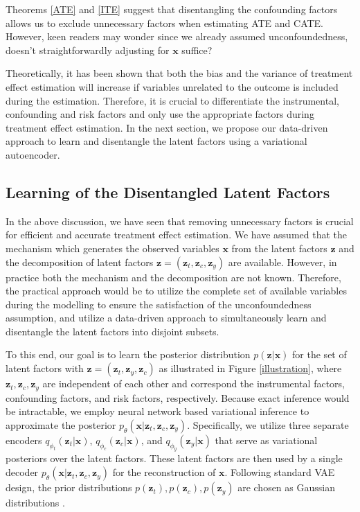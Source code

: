 \documentclass[letterpaper]{article} %
\begin{document}
Theorems \ref{ATE} and \ref{ITE} suggest that disentangling the confounding factors allows us to exclude unnecessary factors when estimating ATE and CATE. However, keen readers may wonder since we already assumed unconfoundedness, doesn't straightforwardly adjusting for $\mathbf{x}$ suffice?

Theoretically, it has been shown that both the bias \cite{Abadie2006} and the variance \cite{Hahn1998} of treatment effect estimation will increase if variables unrelated to the outcome is included during the estimation. Therefore, it is crucial to differentiate the instrumental, confounding and risk factors and only use the appropriate factors during treatment effect estimation.
In the next section, we propose our data-driven approach to learn and disentangle the latent factors using a variational autoencoder.


\subsection*{Learning of the Disentangled Latent Factors}


In the above discussion, we have seen that removing unnecessary factors is crucial for efficient and accurate treatment effect estimation. We have assumed that the mechanism which generates the observed variables $\mathbf{x}$ from the latent factors $\mathbf{z}$ and the decomposition of latent factors $\mathbf{z} = (\mathbf{z}_t, \mathbf{z}_c, \mathbf{z}_y)$ are available.
However, in practice both the mechanism and the decomposition are not known. Therefore, the practical approach would be to utilize the complete set of available variables during the modelling to ensure the satisfaction of the unconfoundedness assumption, and utilize a data-driven approach to simultaneously learn and disentangle the latent factors into disjoint subsets.

To this end, our goal is to learn the posterior distribution $p(\mathbf{z}|\mathbf{x})$ for the set of latent factors  with $\mathbf{z}= (\mathbf{z}_t, \mathbf{z}_y, \mathbf{z}_c)$ as illustrated in Figure \ref{illustration}, where $\mathbf{z}_t,\mathbf{z}_c, \mathbf{z}_y$ are independent of each other and correspond the instrumental factors, confounding factors, and risk factors, respectively.
Because exact inference would be intractable, we employ neural network based variational inference to approximate the posterior $p_\theta(\mathbf{x}|\mathbf{z}_t, \mathbf{z}_c, \mathbf{z}_y)$. Specifically, we utilize three separate encoders $q_{\phi_t}(\mathbf{z}_t|\mathbf{x})$, $q_{\phi_c}(\mathbf{z}_c|\mathbf{x})$, and $q_{\phi_y}(\mathbf{z}_y|\mathbf{x})$ that serve as variational posteriors over the latent factors.
These latent factors are then used by a single decoder $p_\theta(\mathbf{x}|\mathbf{z}_t,\mathbf{z}_c, \mathbf{z}_y)$ for the reconstruction of $\mathbf{x}$. Following standard VAE design, the prior distributions $p(\mathbf{z}_t),p(\mathbf{z}_c),p(\mathbf{z}_y)$ are chosen as Gaussian distributions \cite{Kingma2014}.
\end{document}
